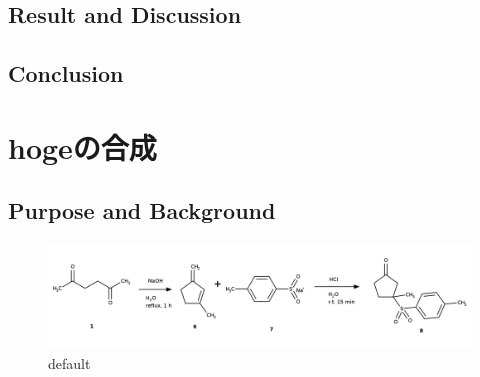 \documentclass{ltjsarticle}
\theoremstyle{definition}
\numberwithin{equation}{section}
\begin{document}
\subsection{Result and Discussion}

\subsection{Conclusion}

\section{hogeの合成}
\subsection{Purpose and Background}
\begin{figure}[htbp]
\begin{center}
\includegraphics[width = 15 cm]{scheme6-2.png}
\caption{default}
\label{default}
\end{center}
\end{figure}
\end{document}
